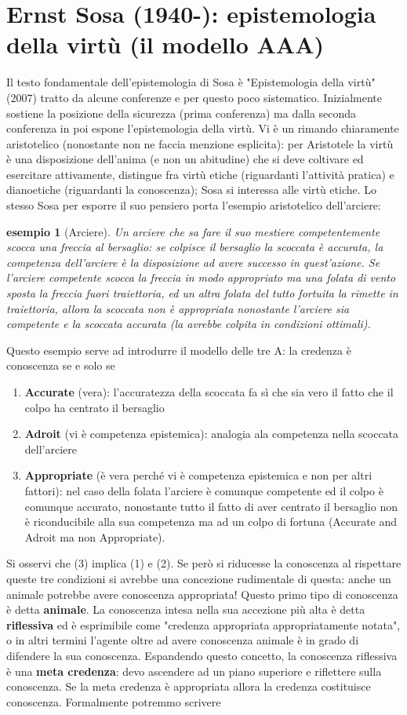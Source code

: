 \documentclass[10pt,a4paper]{article}
\newtheorem{esempio}{esempio}
\begin{document}
\section{Ernst Sosa (1940-): epistemologia della virtù (il modello AAA)}
Il testo fondamentale dell'epistemologia di Sosa è "Epistemologia della virtù" (2007) tratto da alcune conferenze e per questo poco sistematico. Inizialmente sostiene la posizione della sicurezza (prima conferenza) ma dalla seconda conferenza in poi espone l'epistemologia della virtù. Vi è un rimando chiaramente aristotelico (nonostante non ne faccia menzione esplicita): per Aristotele la virtù è una disposizione dell'anima (e non un abitudine) che si deve coltivare ed esercitare attivamente, distingue fra virtù etiche (riguardanti l'attività pratica) e dianoetiche (riguardanti la conoscenza); Sosa si interessa alle virtù etiche. Lo stesso Sosa per esporre il suo pensiero porta l'esempio aristotelico dell'arciere: 
\begin{esempio}[Arciere]
	Un arciere che sa fare il suo mestiere competentemente scocca una freccia al bersaglio: se colpisce il bersaglio la scoccata è accurata, la competenza dell'arciere è la disposizione ad avere successo in quest'azione. Se l'arciere competente scocca la freccia in modo appropriato ma una folata di vento sposta la freccia fuori traiettoria, ed un altra folata del tutto fortuita la rimette in traiettoria, allora la scoccata non è appropriata nonostante l'arciere sia competente e la scoccata accurata (la avrebbe colpita in condizioni ottimali). 
\end{esempio}
Questo esempio serve ad introdurre il modello delle tre A: la credenza è conoscenza se e solo se
\begin{enumerate}
	\item \textbf{Accurate} (vera): l'accuratezza della scoccata fa sì che sia vero il fatto che il colpo ha centrato il bersaglio
	\item \textbf{Adroit} (vi è competenza epistemica): analogia ala competenza nella scoccata dell'arciere
	\item \textbf{Appropriate} (è vera perché vi è competenza epistemica e non per altri fattori): nel caso della folata l'arciere è comunque competente ed il colpo è comunque accurato, nonostante tutto il fatto di aver centrato il bersaglio non è riconducibile alla sua competenza ma ad un colpo di fortuna (Accurate and Adroit ma non Appropriate).
\end{enumerate}
Si osservi che (3) implica (1) e (2). Se però si riducesse la conoscenza al rispettare queste tre condizioni si avrebbe una concezione rudimentale di questa: anche un animale potrebbe avere conoscenza appropriata! Questo primo tipo di conoscenza è detta \textbf{animale}. La conoscenza intesa nella sua accezione più alta è detta \textbf{riflessiva} ed è esprimibile come "credenza appropriata appropriatamente notata", o in altri termini l'agente oltre ad avere conoscenza animale è in grado di difendere la sua conoscenza. Espandendo questo concetto, la conoscenza riflessiva è una \textbf{meta credenza}: devo ascendere ad un piano superiore e riflettere sulla conoscenza. Se la meta credenza è appropriata allora la credenza costituisce conoscenza. Formalmente potremmo scrivere
\end{document}
